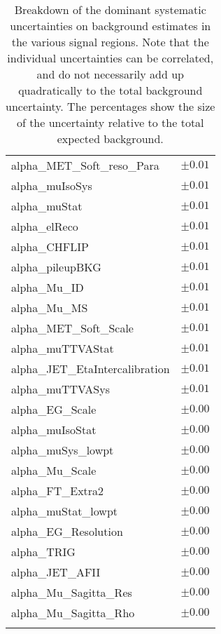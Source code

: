 \begin{table}
\begin{center}
\begin{tabular*}{\textwidth}{@{\extracolsep{\fill}}lc}
alpha\_MET\_Soft\_reso\_Para         & $\pm 0.01$       \\
alpha\_muIsoSys         & $\pm 0.01$       \\
alpha\_muStat         & $\pm 0.01$       \\
alpha\_elReco         & $\pm 0.01$       \\
alpha\_CHFLIP         & $\pm 0.01$       \\
alpha\_pileupBKG         & $\pm 0.01$       \\
alpha\_Mu\_ID         & $\pm 0.01$       \\
alpha\_Mu\_MS         & $\pm 0.01$       \\
alpha\_MET\_Soft\_Scale         & $\pm 0.01$       \\
alpha\_muTTVAStat         & $\pm 0.01$       \\
alpha\_JET\_EtaIntercalibration         & $\pm 0.01$       \\
alpha\_muTTVASys         & $\pm 0.01$       \\
alpha\_EG\_Scale         & $\pm 0.00$       \\
alpha\_muIsoStat         & $\pm 0.00$       \\
alpha\_muSys\_lowpt         & $\pm 0.00$       \\
alpha\_Mu\_Scale         & $\pm 0.00$       \\
alpha\_FT\_Extra2         & $\pm 0.00$       \\
alpha\_muStat\_lowpt         & $\pm 0.00$       \\
alpha\_EG\_Resolution         & $\pm 0.00$       \\
alpha\_TRIG         & $\pm 0.00$       \\
alpha\_JET\_AFII         & $\pm 0.00$       \\
alpha\_Mu\_Sagitta\_Res         & $\pm 0.00$       \\
alpha\_Mu\_Sagitta\_Rho         & $\pm 0.00$       \\
\noalign{\smallskip}\hline\noalign{\smallskip}
\end{tabular*}
\end{center}
\caption[Breakdown of uncertainty on background estimates]{
Breakdown of the dominant systematic uncertainties on background estimates in the various signal regions.
Note that the individual uncertainties can be correlated, and do not necessarily add up quadratically to 
the total background uncertainty. The percentages show the size of the uncertainty relative to the total expected background.
\label{table.results.bkgestimate.uncertainties.Rpc3L0bH}}
\end{table}
\clearpage
%
